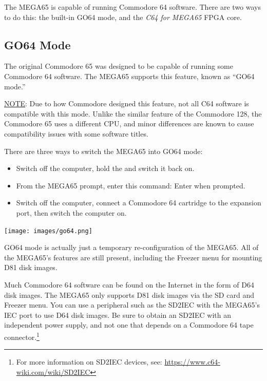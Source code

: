 The MEGA65 is capable of running Commodore 64 software. There are two ways to do this: the built-in GO64 mode, and the {\it C64 for MEGA65} FPGA core.

\subsection{GO64 Mode}

The original Commodore 65 was designed to be capable of running some Commodore 64 software. The MEGA65 supports this feature, known as ``GO64 mode.''

\underline{NOTE}: Due to how Commodore designed this feature, not all C64 software is compatible with this mode. Unlike the similar feature of the Commodore 128, the Commodore 65 uses a different CPU, and minor differences are known to cause compatibility issues with some software titles.

There are three ways to switch the MEGA65 into GO64 mode:

\begin{itemize}
    \item Switch off the computer, hold the \megasymbolkey and switch it back on.
    \item From the MEGA65  prompt, enter this command:  Enter  when prompted.
    \item Switch off the computer, connect a Commodore 64 cartridge to the expansion port, then switch the computer on.
\end{itemize}

\begin{center}
  \texttt{[image: images/go64.png]}
\end{center}

GO64 mode is actually just a temporary re-configuration of the MEGA65. All of the MEGA65's features are still present, including the Freezer menu for mounting D81 disk images.

Much Commodore 64 software can be found on the Internet in the form of D64 disk images. The MEGA65 only supports D81 disk images via the SD card and Freezer menu. You can use a peripheral such as the SD2IEC with the MEGA65's IEC port to use D64 disk images. Be sure to obtain an SD2IEC with an independent power supply, and not one that depends on a Commodore 64 tape connector.\footnote{For more information on SD2IEC devices, see: \url{https://www.c64-wiki.com/wiki/SD2IEC}}

